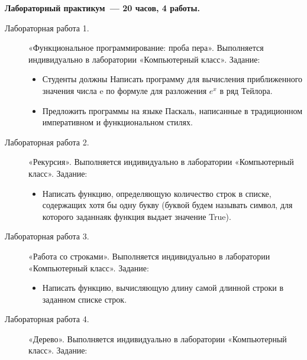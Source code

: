 {\textbf{Лабораторный практикум~— 20 часов, 4 работы.}
\begin{description}
\item[Лабораторная работа 1.] «Функциональное программирование: проба пера». Выполняется индивидуально в лаборатории «Компьютерный класс». Задание: \begin{itemize}
\item Студенты должны Написать программу для вычисления приближенного значения числа e по формуле для разложения $e^x$ в ряд Тейлора.\item Предложить программы на языке Паскаль, написанные в традиционном императивном и функциональном стилях.
\end{itemize}\item[Лабораторная работа 2.] «Рекурсия». Выполняется индивидуально в лаборатории «Компьютерный класс». Задание: \begin{itemize}
\item Написать функцию, определяющую количество строк в списке, содержащих хотя бы одну букву (буквой будем называть символ, для которого заданнаяк функция выдает значение True).
\end{itemize}\item[Лабораторная работа 3.] «Работа со строками». Выполняется индивидуально в лаборатории «Компьютерный класс». Задание: \begin{itemize}
\item Написать функцию, вычисляющую длину самой длинной строки в заданном списке строк.
\end{itemize}\item[Лабораторная работа 4.] «Дерево». Выполняется индивидуально в лаборатории «Компьютерный класс». Задание: \begin{itemize}

\end{itemize}
\end{description}}
